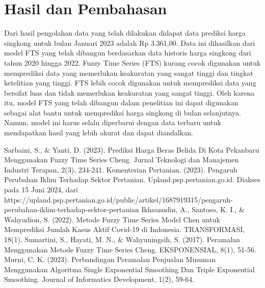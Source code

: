\documentclass[conference]{IEEEtran}
\begin{document}
\section{Hasil dan Pembahasan}
Dari hasil pengolahan data yang telah dilakukan didapat data prediksi harga singkong untuk bulan Januari 2023 adalah Rp 3.361,00. Data ini dihasilkan dari model FTS yang telah dibangun berdasarkan data historis harga singkong dari tahun 2020 hingga 2022.
Fuzzy Time Series (FTS) kurang cocok digunakan untuk memprediksi data yang memerlukan keakuratan yang sangat tinggi dan tingkat ketelitian yang tinggi. FTS lebih cocok digunakan untuk memprediksi data yang bersifat luas dan tidak memerlukan keakuratan yang sangat tinggi. Oleh karena itu, model FTS yang telah dibangun dalam penelitian ini dapat digunakan sebagai alat bantu untuk memprediksi harga singkong di bulan selanjutnya. Namun, model ini harus selalu diperbarui dengan data terbaru untuk mendapatkan hasil yang lebih akurat dan dapat diandalkan.



\begin{thebibliography}{00}
 Sarbaini, S., \& Yanti, D. (2023). Prediksi Harga Beras Belida Di Kota Pekanbaru Menggunakan Fuzzy Time Series Cheng. Jurnal Teknologi dan Manajemen Industri Terapan, 2(3), 234-241.
Kementerian Pertanian. (2023). Pengaruh Perubahan Iklim Terhadap Sektor Pertanian. Upland.psp.pertanian.go.id. Diakses pada 15 Juni 2024, dari https://upland.psp.pertanian.go.id/public/artikel/1687919315/pengaruh-perubahan-iklim-terhadap-sektor-pertanian
 Ikhsanudin, A., Santoso, K. I., \& Wahyudion, S. (2022). Metode Fuzzy Time Series Model Chen untuk Memprediksi Jumlah Kasus Aktif Covid-19 di Indonesia. TRANSFORMASI, 18(1).
 Sumartini, S., Hayati, M. N., \& Wahyuningsih, S. (2017). Peramalan Menggunakan Metode Fuzzy Time Series Cheng. EKSPONENSIAL, 8(1), 51-56.
 Murni, C. K. (2023). Perbandingan Peramalan Penjualan Minuman Menggunakan Algoritma Single Exponential Smoothing Dan Triple Exponential Smoothing. Journal of Informatics Development, 1(2), 59-64.
\end{thebibliography}
\end{document}
